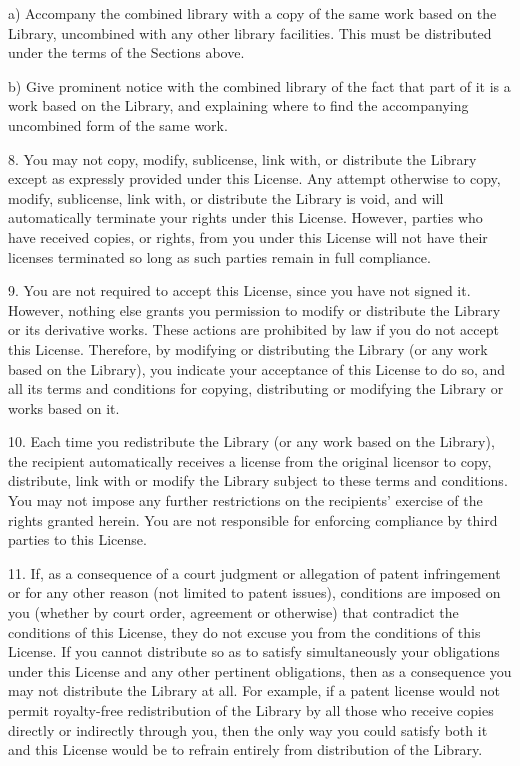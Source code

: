 \documentclass[a4paper,11pt]{report}
\begin{document}
\begin{indented}{1cm}
a) Accompany the combined library with a copy of the same work
based on the Library, uncombined with any other library
facilities. This must be distributed under the terms of the
Sections above.

b) Give prominent notice with the combined library of the fact
that part of it is a work based on the Library, and explaining
where to find the accompanying uncombined form of the same work.
\end{indented}

8. You may not copy, modify, sublicense, link with, or distribute
the Library except as expressly provided under this License. Any
attempt otherwise to copy, modify, sublicense, link with, or
distribute the Library is void, and will automatically terminate your
rights under this License. However, parties who have received copies,
or rights, from you under this License will not have their licenses
terminated so long as such parties remain in full compliance.

9. You are not required to accept this License, since you have not
signed it. However, nothing else grants you permission to modify or
distribute the Library or its derivative works. These actions are
prohibited by law if you do not accept this License. Therefore, by
modifying or distributing the Library (or any work based on the
Library), you indicate your acceptance of this License to do so, and
all its terms and conditions for copying, distributing or modifying
the Library or works based on it.

10. Each time you redistribute the Library (or any work based on the
Library), the recipient automatically receives a license from the
original licensor to copy, distribute, link with or modify the Library
subject to these terms and conditions. You may not impose any further
restrictions on the recipients' exercise of the rights granted herein.
You are not responsible for enforcing compliance by third parties to
this License.

11. If, as a consequence of a court judgment or allegation of patent
infringement or for any other reason (not limited to patent issues),
conditions are imposed on you (whether by court order, agreement or
otherwise) that contradict the conditions of this License, they do not
excuse you from the conditions of this License. If you cannot
distribute so as to satisfy simultaneously your obligations under this
License and any other pertinent obligations, then as a consequence you
may not distribute the Library at all. For example, if a patent
license would not permit royalty-free redistribution of the Library by
all those who receive copies directly or indirectly through you, then
the only way you could satisfy both it and this License would be to
refrain entirely from distribution of the Library.
\end{document}
